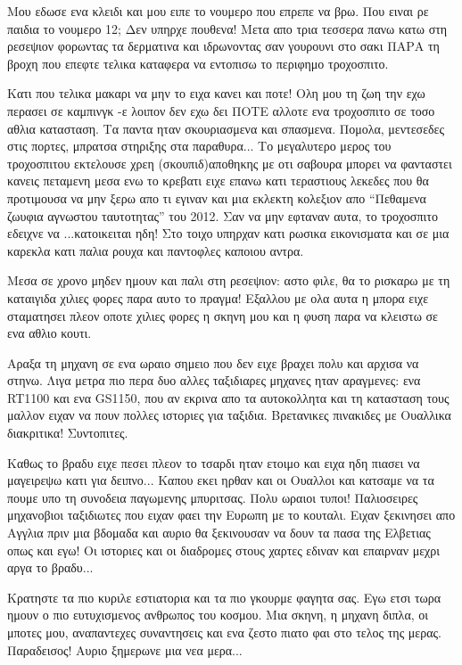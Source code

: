 \documentclass[11pt, letterpaper]{book}
\begin{document}
Μου εδωσε ενα κλειδι και μου ειπε το νουμερο που επρεπε να βρω. Που ειναι ρε παιδια το νουμερο 12; Δεν υπηρχε πουθενα! Μετα απο τρια τεσσερα πανω κατω στη ρεσεψιον φορωντας τα δερματινα και ιδρωνοντας σαν γουρουνι στο σακι ΠΑΡΑ τη βροχη που επεφτε τελικα καταφερα να εντοπισω το περιφημο τροχοσπιτο. 

Κατι που τελικα μακαρι να μην το ειχα κανει και ποτε! Ολη μου τη ζωη την εχω περασει σε καμπινγκ -ε λοιπον δεν εχω δει ΠΟΤΕ αλλοτε ενα τροχοσπιτο σε τοσο αθλια κατασταση. Τα παντα ηταν σκουριασμενα και σπασμενα. Πομολα, μεντεσεδες στις πορτες, μπρατσα στηριξης στα παραθυρα... Το μεγαλυτερο μερος του τροχοσπιτου εκτελουσε χρεη (σκουπιδ)αποθηκης με οτι σαβουρα μπορει να φανταστει κανεις πεταμενη μεσα ενω το κρεβατι ειχε επανω κατι τεραστιους λεκεδες που θα προτιμουσα να μην ξερω απο τι εγιναν και μια εκλεκτη κολεξιον απο ``Πεθαμενα ζωυφια αγνωστου ταυτοτητας'' του 2012. 
Σαν να μην εφταναν αυτα, το τροχοσπιτο εδειχνε να ...κατοικειται ηδη! Στο τοιχο υπηρχαν κατι ρωσικα εικονισματα και σε μια καρεκλα κατι παλια ρουχα και παντοφλες καποιου αντρα.

Μεσα σε χρονο μηδεν ημουν και παλι στη ρεσεψιον: αστο φιλε, θα το ρισκαρω με τη καταιγιδα χιλιες φορες παρα αυτο το πραγμα!
Εξαλλου με ολα αυτα η μπορα ειχε σταματησει πλεον οποτε χιλιες φορες η σκηνη μου και η φυση παρα να κλειστω σε ενα αθλιο κουτι.

Αραξα τη μηχανη σε ενα ωραιο σημειο που δεν ειχε βραχει πολυ και αρχισα να στηνω. 
Λιγα μετρα πιο περα δυο αλλες ταξιδιαρες μηχανες ηταν αραγμενες: ενα RT1100 και ενα GS1150, που αν εκρινα απο τα αυτοκολλητα και τη κατασταση τους μαλλον ειχαν να πουν πολλες ιστοριες για ταξιδια. 
Βρετανικες πινακιδες με Ουαλλικα διακριτικα! Συντοπιτες.

Καθως το βραδυ ειχε πεσει πλεον το τσαρδι ηταν ετοιμο και ειχα ηδη πιασει να μαγειρεψω κατι για δειπνο...
Καπου εκει ηρθαν και οι Ουαλλοι και κατσαμε να τα πουμε υπο τη συνοδεια παγωμενης μπυριτσας. 
Πολυ ωραιοι τυποι! Παλιοσειρες μηχανοβιοι ταξιδιωτες που ειχαν φαει την Ευρωπη με το κουταλι. Ειχαν ξεκινησει απο Αγγλια πριν μια βδομαδα και αυριο θα ξεκινουσαν να δουν τα πασα της Ελβετιας οπως και εγω! Οι ιστοριες και οι διαδρομες στους χαρτες εδιναν και επαιρναν μεχρι αργα το βραδυ...

Κρατηστε τα πιο κυριλε εστιατορια και τα πιο γκουρμε φαγητα σας. Εγω ετσι τωρα ημουν ο πιο ευτυχισμενος ανθρωπος του κοσμου. Μια σκηνη, η μηχανη διπλα, οι μποτες μου, αναπαντεχες συναντησεις και ενα ζεστο πιατο φαι στο τελος της μερας. Παραδεισος! 
Αυριο ξημερωνε μια νεα μερα...
\end{document}
